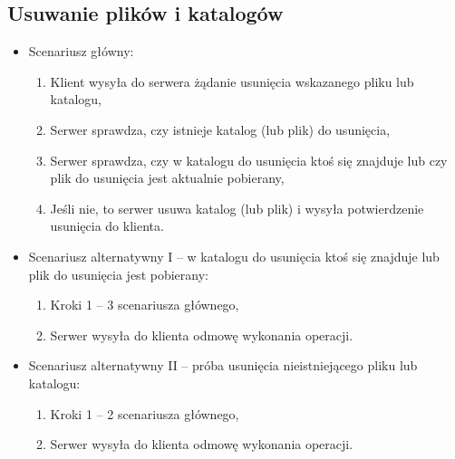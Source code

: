 \documentclass[10pt,a4paper]{article}
\begin{document}
\subsection{Usuwanie plików i katalogów}
\begin{itemize}
    \item Scenariusz główny:
    \begin{enumerate}
        \item Klient wysyła do serwera żądanie usunięcia wskazanego pliku lub katalogu,
        \item Serwer sprawdza, czy istnieje katalog (lub plik) do usunięcia,
        \item Serwer sprawdza, czy w katalogu do usunięcia ktoś się znajduje lub czy plik do usunięcia jest aktualnie pobierany,
        \item Jeśli nie, to serwer usuwa katalog (lub plik) i wysyła potwierdzenie usunięcia do klienta.
    \end{enumerate}
    
    \item Scenariusz alternatywny I -- w katalogu do usunięcia ktoś się znajduje lub plik do usunięcia jest pobierany:
    \begin{enumerate}
        \item Kroki 1 -- 3 scenariusza głównego,
        \item Serwer wysyła do klienta odmowę wykonania operacji.
    \end{enumerate}
    
    \item Scenariusz alternatywny II -- próba usunięcia nieistniejącego pliku lub katalogu:
    \begin{enumerate}
        \item Kroki 1 -- 2 scenariusza głównego,
        \item Serwer wysyła do klienta odmowę wykonania operacji.
    \end{enumerate}
\end{itemize}
\end{document}
